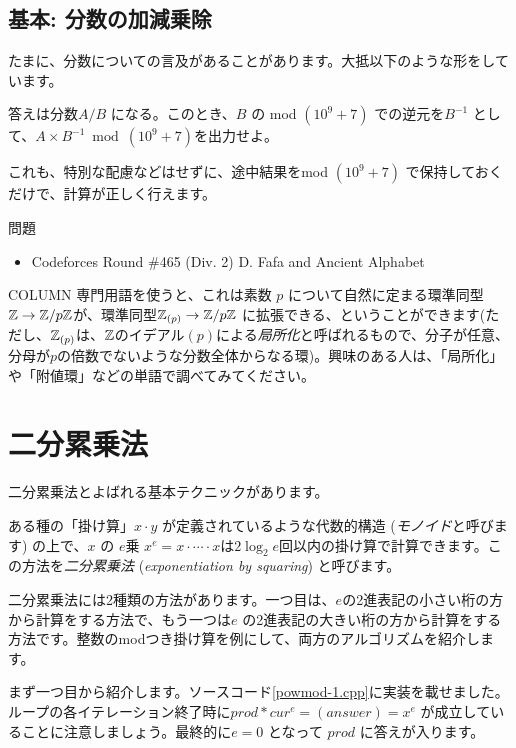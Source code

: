 \documentclass{jsarticle}
\begin{document}
  \subsection{基本: 分数の加減乗除}
  \label{subsec:operations-on-fractions}
  たまに、分数についての言及があることがあります。大抵以下のような形をしています。
  \begin{center}
   答えは分数$A/B$ になる。このとき、$B$ の mod $(10^9+7)$ での逆元を$B^{-1}$ として、$A \times B^{-1} \bmod (10^9 + 7)$を出力せよ。
  \end{center}
  これも、特別な配慮などはせずに、途中結果をmod $(10^9+7)$ で保持しておくだけで、計算が正しく行えます。
  \begin{itembox}[l]{問題}
   \begin{itemize}
    \item Codeforces Round \#465 (Div. 2) D. Fafa and Ancient Alphabet
   \end{itemize}
  \end{itembox}
  \begin{itembox}[l]{COLUMN}
   専門用語を使うと、これは素数 $p$ について自然に定まる環準同型$\mathbb{Z} \to \mathbb{Z}/p\mathbb{Z}$が、環準同型$\mathbb{Z}_{(p)} \to \mathbb{Z}/p\mathbb{Z}$ に拡張できる、ということができます(ただし、$\mathbb{Z}_{(p)}$は、$\mathbb{Z}$のイデアル$(p)$による\emph{局所化}と呼ばれるもので、分子が任意、分母が$p$の倍数でないような分数全体からなる環)。興味のある人は、「局所化」や「附値環」などの単語で調べてみてください。
  \end{itembox}
 \section{二分累乗法}
 \label{sec:exponentiation-by-squaring}
 二分累乗法とよばれる基本テクニックがあります。

 ある種の「掛け算」$x \cdot y$ が定義されているような代数的構造 (\emph{モノイド}と呼びます) の上で、$x$ の $e$乗 $x^e = x \cdot \cdots \cdot x$は$2\log_2 e$回以内の掛け算で計算できます。この方法を\emph{二分累乗法} (\emph{exponentiation by squaring}) と呼びます。

 二分累乗法には2種類の方法があります。一つ目は、$e$の2進表記の小さい桁の方から計算をする方法で、もう一つは$e$ の2進表記の大きい桁の方から計算をする方法です。整数のmodつき掛け算を例にして、両方のアルゴリズムを紹介します。

 まず一つ目から紹介します。ソースコード\ref{powmod-1.cpp}に実装を載せました。
 ループの各イテレーション終了時に$prod * cur^e = (answer) = x^e$ が成立していることに注意しましょう。最終的に$e = 0$ となって $prod$ に答えが入ります。
 
\end{document}
